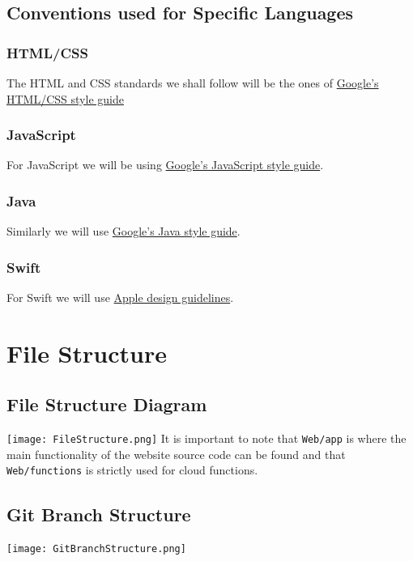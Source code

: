 \documentclass[12pt]{article}
\begin{document}
  \subsection{Conventions used for Specific Languages}
  \subsubsection{HTML/CSS}
  The HTML and CSS standards we shall follow will be the ones of \href{https://google.github.io/styleguide/htmlcssguide.html}{Google's HTML/CSS style guide}
  
  \subsubsection{JavaScript}
  For JavaScript we will be using \href{https://google.github.io/styleguide/jsguide.html}{Google's JavaScript style guide}.
  
  \subsubsection{Java}
  Similarly we will use \href{https://google.github.io/styleguide/javaguide.html}{Google's Java style guide}.
  
  \subsubsection{Swift}
  For Swift we will use \href{https://swift.org/documentation/api-design-guidelines/}{Apple design guidelines}.
  
\center\section{File Structure}
  \subsection{File Structure Diagram}
  \flushleft 
  \texttt{[image: FileStructure.png]}
  It is important to note that \texttt{Web/app} is where the main functionality of the website source code can be found and that \texttt{Web/functions} is strictly used for cloud functions.
  
  \center\subsection{Git Branch Structure}
  \texttt{[image: GitBranchStructure.png]}
  
\end{document}
